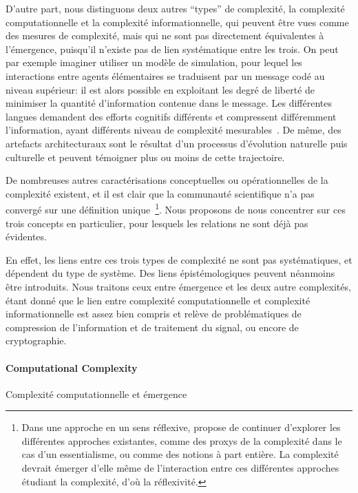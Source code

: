 D'autre part, nous distinguons deux autres ``types'' de complexité, la complexité computationnelle et la complexité informationnelle, qui peuvent être vues comme des mesures de complexité, mais qui ne sont pas directement équivalentes à l'émergence, puisqu'il n'existe pas de lien systématique entre les trois. On peut par exemple imaginer utiliser un modèle de simulation, pour lequel les interactions entre agents élémentaires se traduisent par un message codé au niveau supérieur: il est alors possible en exploitant les degré de liberté de minimiser la quantité d'information contenue dans le message. Les différentes langues demandent des efforts cognitifs différents et compressent différemment l'information, ayant différents niveau de complexité mesurables~\cite{febres2013complexity}. De même, des artefacts architecturaux sont le résultat d'un processus d'évolution naturelle puis culturelle et peuvent témoigner plus ou moins de cette trajectoire.

De nombreuses autres caractérisations conceptuelles ou opérationnelles de la complexité existent, et il est clair que la communauté scientifique n'a pas convergé sur une définition unique~\cite{chu2008criteria}\footnote{Dans une approche en un sens réflexive, \cite{chu2008criteria} propose de continuer d'explorer les différentes approches existantes, comme des proxys de la complexité dans le cas d'un essentialisme, ou comme des notions à part entière. La complexité devrait émerger d'elle même de l'interaction entre ces différentes approches étudiant la complexité, d'où la réflexivité.}. Nous proposons de nous concentrer sur ces trois concepts en particulier, pour lesquels les relations ne sont déjà pas évidentes.


En effet, les liens entre ces trois types de complexité ne sont pas systématiques, et dépendent du type de système. Des liens épistémologiques peuvent néanmoins être introduits. Nous traitons ceux entre émergence et les deux autre complexités, étant donné que le lien entre complexité computationnelle et complexité informationnelle est assez bien compris et relève de problématiques de compression de l'information et de traitement du signal, ou encore de cryptographie.



\paragraph{Computational Complexity}{Complexité computationnelle et émergence}



